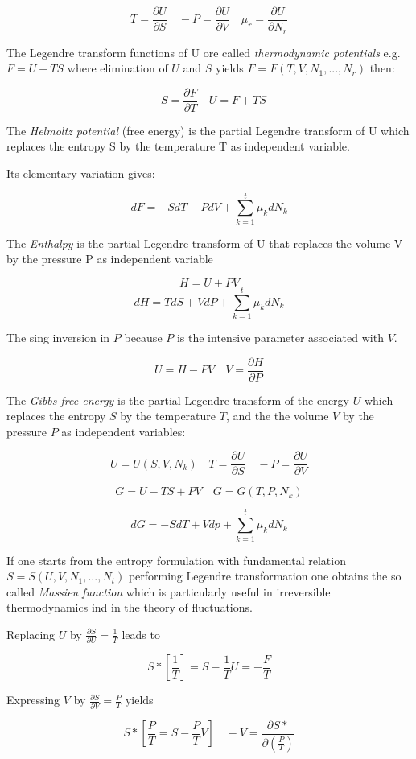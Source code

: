 \documentclass{article}
\begin{document}
$$T = \frac{\partial U}{\partial S} \quad -P =  \frac{\partial U}{\partial V} \quad \mu_r = \frac{\partial U}{\partial N_r}$$

The Legendre transform functions of U ore called \emph{thermodynamic potentials} e.g. $F=U-TS$ where elimination of $U$ and $S$ yields $F=F(T,V,N_1,...,N_r)$ then:

$$ -S = \frac{\partial F}{\partial T} \quad U = F + TS$$

The \emph{Helmoltz potential} (free energy) is the partial Legendre transform of U which replaces the entropy S by the temperature T as independent variable.

Its elementary variation gives:

$$d F = - S dT - P dV + \sum_{k=1}^{t} \mu_k dN_k$$

The \emph{Enthalpy} is the partial Legendre transform of U that replaces the volume V by the pressure P as independent variable

$$H = U + PV $$
$$ dH = T dS + V dP +  \sum_{k=1}^{t} \mu_k dN_k$$

The sing inversion in $P$ because $P$ is the intensive parameter associated with $V$.

$$U = H - PV \quad V = \frac{\partial H}{\partial P}$$

The \emph{Gibbs free energy} is the partial Legendre transform of the energy $U$ which replaces the entropy $S$ by the temperature $T$, and the the volume $V$ by the pressure $P$ as independent variables:

$$U=U(S,V,N_k) \quad T = \frac{\partial U}{\partial S} \quad -P = \frac{\partial U}{\partial V}$$

$$G = U - TS + PV \quad G=G(T,P,N_k)$$

$$dG = -SdT+Vdp+\sum_{k=1}^{t} \mu_k dN_k$$

If one starts from the entropy formulation with fundamental relation $S=S(U,V,N_1,...,N_t)$ performing Legendre transformation one obtains the so called \emph{Massieu function} which is particularly useful in irreversible thermodynamics ind in the theory of fluctuations.

Replacing $U$ by $\frac{\partial S}{\partial U} = \frac{1}{T}$ leads to

$$S*[ \frac{1}{T} ] = S - \frac{1}{T} U = - \frac{F}{T}$$

Expressing $V$ by $\frac{\partial S}{\partial V} =  \frac{P}{T}$ yields

$$S*[ \frac{P}{T} = S -  \frac{P}{T} V] \quad -V =  \frac{\partial S*}{\partial(\frac{P}{T})}$$
\end{document}
